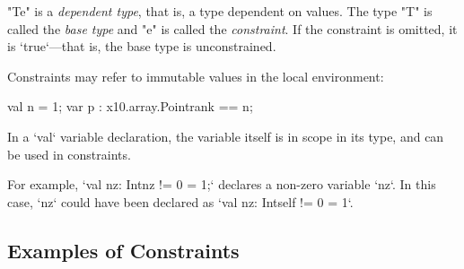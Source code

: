 \xcd"T{e}" is a {\em dependent type}, that is, a type dependent on values. The
type \xcd"T" is called the {\em base type} and \xcd"e" is called the {\em
  constraint}. If the constraint is omitted, it is \xcd`true`---that is, the
  base type is unconstrained.

Constraints may refer to immutable values in the local environment: 
\begin{xten}
     val n = 1;
     var p : x10.array.Point{rank == n};
\end{xten}
In a \xcd`val` variable declaration, the variable itself is in scope in its
type, and can be used in constraints.

\begin{ex}
For example, \xcd`val nz: Int{nz != 0} = 1;` declares a
non-zero variable \xcd`nz`.
In this case, \xcd`nz` could have been declared as
\xcd`val nz: Int{self != 0} = 1`.  
\end{ex}

\subsection{Examples of Constraints}
\label{ConstraintExamples}

